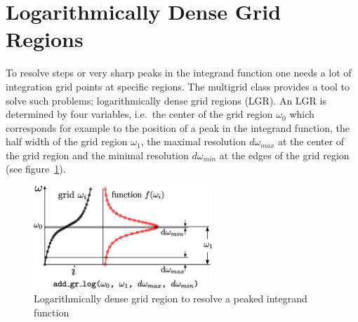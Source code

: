 \section{Logarithmically Dense Grid Regions}
To resolve steps or very sharp peaks in the integrand function one needs a lot of integration grid points at specific regions. The multigrid class provides a tool to solve such problems: logarithmically dense grid regions (LGR). An LGR is determined by four variables, i.e.~the center of the grid region $\omega_0$ which corresponds for example to the position of a peak in the integrand function, the half width of the grid region $\omega_1$, the maximal resolution $d\omega_{max}$ at the center of the grid region and the minimal resolution $d\omega_{min}$ at the edges of the grid region (see figure~\ref{fig:lgr}). 
\begin{figure}[h]
	\centering
	\includegraphics[width=0.6\textwidth]{pics/loggridregion.eps}
	\caption{Logarithmically dense grid region to resolve a peaked integrand function}
	\label{fig:lgr}
\end{figure}

